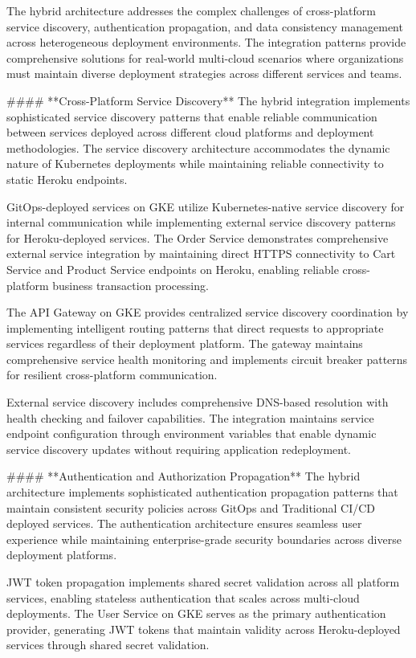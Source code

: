The hybrid architecture addresses the complex challenges of cross-platform service discovery, authentication propagation, and data consistency management across heterogeneous deployment environments. The integration patterns provide comprehensive solutions for real-world multi-cloud scenarios where organizations must maintain diverse deployment strategies across different services and teams.

#### **Cross-Platform Service Discovery**
The hybrid integration implements sophisticated service discovery patterns that enable reliable communication between services deployed across different cloud platforms and deployment methodologies. The service discovery architecture accommodates the dynamic nature of Kubernetes deployments while maintaining reliable connectivity to static Heroku endpoints.

GitOps-deployed services on GKE utilize Kubernetes-native service discovery for internal communication while implementing external service discovery patterns for Heroku-deployed services. The Order Service demonstrates comprehensive external service integration by maintaining direct HTTPS connectivity to Cart Service and Product Service endpoints on Heroku, enabling reliable cross-platform business transaction processing.

The API Gateway on GKE provides centralized service discovery coordination by implementing intelligent routing patterns that direct requests to appropriate services regardless of their deployment platform. The gateway maintains comprehensive service health monitoring and implements circuit breaker patterns for resilient cross-platform communication.

External service discovery includes comprehensive DNS-based resolution with health checking and failover capabilities. The integration maintains service endpoint configuration through environment variables that enable dynamic service discovery updates without requiring application redeployment.

#### **Authentication and Authorization Propagation**
The hybrid architecture implements sophisticated authentication propagation patterns that maintain consistent security policies across GitOps and Traditional CI/CD deployed services. The authentication architecture ensures seamless user experience while maintaining enterprise-grade security boundaries across diverse deployment platforms.

JWT token propagation implements shared secret validation across all platform services, enabling stateless authentication that scales across multi-cloud deployments. The User Service on GKE serves as the primary authentication provider, generating JWT tokens that maintain validity across Heroku-deployed services through shared secret validation.


